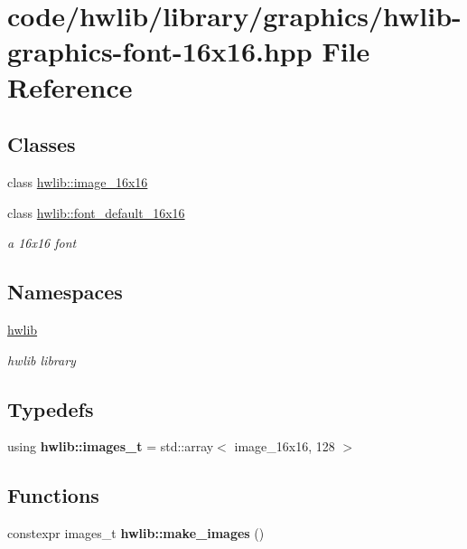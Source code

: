 \hypertarget{hwlib-graphics-font-16x16_8hpp}{}\section{code/hwlib/library/graphics/hwlib-\/graphics-\/font-\/16x16.hpp File Reference}
\label{hwlib-graphics-font-16x16_8hpp}
\subsection*{Classes}
\begin{DoxyCompactItemize}
\item 
class \hyperlink{classhwlib_1_1image__16x16}{hwlib\+::image\+\_\+16x16}
\item 
class \hyperlink{classhwlib_1_1font__default__16x16}{hwlib\+::font\+\_\+default\+\_\+16x16}
\begin{DoxyCompactList}\small\item\em a 16x16 font \end{DoxyCompactList}\end{DoxyCompactItemize}
\subsection*{Namespaces}
\begin{DoxyCompactItemize}
\item 
 \hyperlink{namespacehwlib}{hwlib}
\begin{DoxyCompactList}\small\item\em hwlib library \end{DoxyCompactList}\end{DoxyCompactItemize}
\subsection*{Typedefs}
\begin{DoxyCompactItemize}
\item 
\mbox{\label{namespacehwlib_ad90ec7905770f55cdfde2b5532729e4b}} 
using {\bfseries hwlib\+::images\+\_\+t} = std\+::array$<$ image\+\_\+16x16, 128 $>$
\end{DoxyCompactItemize}
\subsection*{Functions}
\begin{DoxyCompactItemize}
\item 
\mbox{\label{namespacehwlib_af0735cb7aee25e2ff3c65a8f2efed6f2}} 
constexpr images\+\_\+t {\bfseries hwlib\+::make\+\_\+images} ()
\end{DoxyCompactItemize}

